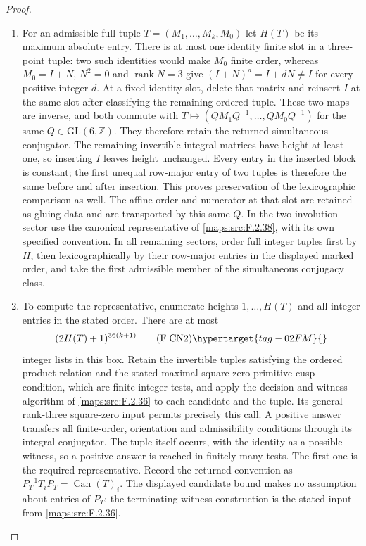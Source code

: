 \begin{proof}
\begin{enumerate}[label={$\langle1\rangle$\arabic*.}]
\item For an admissible full tuple $T=(M_1,\ldots,M_k,M_0)$ let
$H(T)$ be its maximum absolute entry. There is at most one identity
finite slot in a three-point tuple: two such identities would make
$M_0$ finite order, whereas $M_0=I+N$, $N^2=0$ and
$\operatorname{rank}N=3$ give $(I+N)^d=I+dN\ne I$ for every
positive integer $d$. At a fixed identity slot, delete that matrix
and reinsert $I$ at the same slot after classifying the remaining
ordered tuple. These two maps are inverse, and both commute with
$T\mapsto (QM_1Q^{-1},\ldots,QM_0Q^{-1})$ for the same
$Q\in\mathrm{GL}(6,\mathbb Z)$. They therefore retain the returned simultaneous conjugator. The remaining invertible integral
matrices have height at least one, so inserting $I$ leaves height
unchanged. Every entry in the inserted block is constant; the first
unequal row-major entry of two tuples is therefore the same before
and after insertion. This proves preservation of the lexicographic comparison as well. The affine order and
numerator at that slot are retained as gluing data and are transported
by this same $Q$. In the two-involution sector use the canonical
representative of \ref{maps:src:F.2.38}, with its own specified
convention. In all remaining sectors, order full integer tuples
first by $H$, then lexicographically by their row-major entries in
the displayed marked order, and take the first admissible member
of the simultaneous conjugacy class.

\item To compute the representative, enumerate heights
$1,\ldots,H(T)$ and all integer entries in the stated order.
There are at most
\[
 (2H(T)+1)^{36(k+1)}
 \tag{F.CN2}\hypertarget{tag-02FM}{}\label{maps:eq:F.CN2}
\]
integer lists in this box. Retain the invertible tuples satisfying
the ordered product relation and the stated maximal square-zero
primitive cusp condition, which are finite integer tests, and
apply the decision-and-witness algorithm of
\cref{maps:src:F.2.36} to each candidate and the tuple.
Its general rank-three square-zero input permits precisely this
call. A positive answer transfers all finite-order, orientation
and admissibility conditions through its integral
conjugator. The tuple itself occurs, with the identity
as a possible witness, so a positive answer is reached in
finitely many tests. The first one is the required representative.
Record the returned convention as
$P_T^{-1}T_iP_T=\operatorname{Can}(T)_i$.
The displayed candidate bound makes no assumption about entries
of $P_T$; the terminating witness construction is the stated
input from \cref{maps:src:F.2.36}.


\end{enumerate}
\end{proof}
